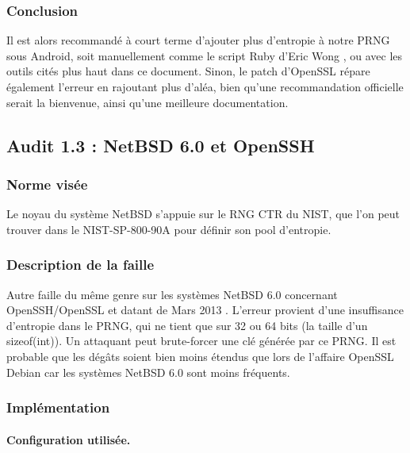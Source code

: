 		\subsubsection{Conclusion}		
		
			Il est alors recommandé à court terme d'ajouter plus d'entropie à notre PRNG sous Android, soit manuellement comme le script Ruby d'Eric Wong \cite{boblet2013android}, ou avec les outils cités plus haut dans ce document. Sinon, le patch d'OpenSSL \cite{alex2013android} répare également l'erreur en rajoutant plus d'aléa, bien qu'une recommandation officielle serait la bienvenue, ainsi qu'une meilleure documentation.\\

			
	\subsection{Audit 1.3 : NetBSD 6.0 et OpenSSH}
		\subsubsection{Norme visée}
		
			Le noyau du système NetBSD s'appuie sur le RNG CTR du NIST, que l'on peut trouver dans le NIST-SP-800-90A \cite{nist800-90A} pour définir son pool d'entropie.	
		
		\subsubsection{Description de la faille}
		
			Autre faille du même genre sur les systèmes NetBSD 6.0 concernant OpenSSH/OpenSSL et datant de Mars 2013 \cite{alerteBSD2013} \cite{failleNetBSDPatrick}. L'erreur provient d'une insuffisance d'entropie dans le PRNG, qui ne tient que sur 32 ou 64 bits (la taille d'un sizeof(int)). Un attaquant peut brute-forcer une clé générée par ce PRNG. Il est probable que les dégâts soient bien moins étendus que lors de l'affaire OpenSSL Debian car les systèmes NetBSD 6.0 sont moins fréquents.\\
			
		\subsubsection{Implémentation}
			
			\paragraph{Configuration utilisée.\\} 
			
